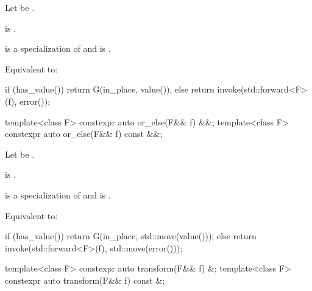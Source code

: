 \begin{itemdescr}
\pnum
Let  be .

\pnum
\constraints
{} is .

\pnum
\mandates
{} is a specialization of  and
 is .

\pnum
\effects
Equivalent to:
\begin{codeblock}
if (has_value())
  return G(in_place, value());
else
  return invoke(std::forward<F>(f), error());
\end{codeblock}
\end{itemdescr}

%
\begin{itemdecl}
template<class F> constexpr auto or_else(F&& f) &&;
template<class F> constexpr auto or_else(F&& f) const &&;
\end{itemdecl}

\begin{itemdescr}
\pnum
Let  be
.

\pnum
\constraints
{} is .

\pnum
\mandates
{} is a specialization of  and
 is .

\pnum
\effects
Equivalent to:
\begin{codeblock}
if (has_value())
  return G(in_place, std::move(value()));
else
  return invoke(std::forward<F>(f), std::move(error()));
\end{codeblock}
\end{itemdescr}

%
\begin{itemdecl}
template<class F> constexpr auto transform(F&& f) &;
template<class F> constexpr auto transform(F&& f) const &;
\end{itemdecl}


